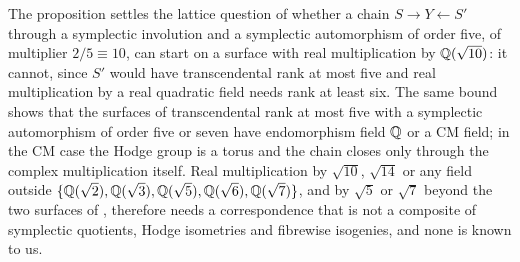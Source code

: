\begin{remark}\label{rem:sqrt10}
The proposition settles the lattice question of whether a chain $S\to Y\leftarrow S'$ through a symplectic involution and a symplectic automorphism of order five, of multiplier $2/5\equiv10$, can start on a surface with real multiplication by $\mathbb{Q}(\sqrt{10})$: it cannot, since $S'$ would have transcendental rank at most five and real multiplication by a real quadratic field needs rank at least six. The same bound shows that the surfaces of transcendental rank at most five with a symplectic automorphism of order five or seven have endomorphism field $\mathbb{Q}$ or a CM field; in the CM case the Hodge group is a torus and the chain closes only through the complex multiplication itself. Real multiplication by $\sqrt{10}$, $\sqrt{14}$ or any field outside $\{\mathbb{Q}(\sqrt2),\mathbb{Q}(\sqrt3),\mathbb{Q}(\sqrt5),\mathbb{Q}(\sqrt6),\mathbb{Q}(\sqrt7)\}$, and by $\sqrt5$ or $\sqrt7$ beyond the two surfaces of \cite{vGS25}, therefore needs a correspondence that is not a composite of symplectic quotients, Hodge isometries and fibrewise isogenies, and none is known to us.
\end{remark}

